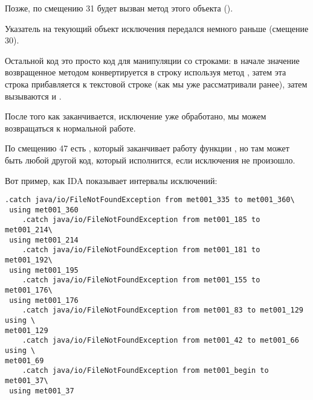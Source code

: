 Позже, по смещению 31 будет вызван метод этого объекта ().

Указатель  на текующий объект исключения передался немного раньше (смещение 30).

Остальной код это просто код для манипуляции со строками: 
в начале значение возвращенное методом 
конвертируется в строку используя метод , 
затем эта строка прибавляется к текстовой строке
 (как мы уже рассматривали ранее),
затем вызываются  и .

После того как  заканчивается, исключение уже обработано, мы можем
возвращаться к нормальной работе.

По смещению 47 есть , который заканчивает работу функции \main, 
но там может быть любой другой код, который исполнится, если исключения не произошло.

Вот пример, как IDA показывает интервалы исключений:

\begin{lstlisting}[caption=из какого-то случайного найденного на компьютере автора .class-файла]
    .catch java/io/FileNotFoundException from met001_335 to met001_360\
 using met001_360
    .catch java/io/FileNotFoundException from met001_185 to met001_214\
 using met001_214
    .catch java/io/FileNotFoundException from met001_181 to met001_192\
 using met001_195
    .catch java/io/FileNotFoundException from met001_155 to met001_176\
 using met001_176
    .catch java/io/FileNotFoundException from met001_83 to met001_129 using \
met001_129
    .catch java/io/FileNotFoundException from met001_42 to met001_66 using \
met001_69
    .catch java/io/FileNotFoundException from met001_begin to met001_37\
 using met001_37
\end{lstlisting}

